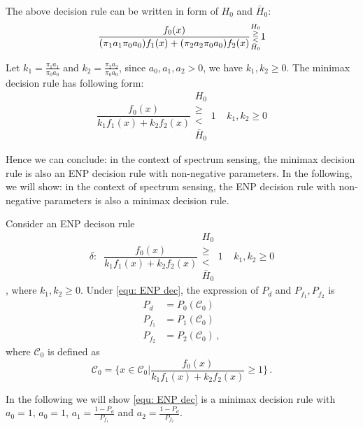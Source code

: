 \documentclass[12pt,journal,a4paper,twoside,onecolumn]{IEEEtran}
\begin{document}
\begin{spacing}{2.5}
The above decision rule can be written in form of $H_0$ and $\bar{H}_0$: 
\begin{equation}
\label{dec: delta}
\frac{f_0(x)}{(\pi_1a_1\/\pi_0a_0)f_1(x) + (\pi_2a_2\/\pi_0a_0)f_2(x)} \substack{H_0 \\ \geq \\ < \\ \bar{H}_0} 1
\end{equation}

Let $k_1 = \frac{\pi_1a_1}{\pi_0a_0}$ and $k_2 = \frac{\pi_2a_2}{\pi_0a_0}$, since $a_0, a_1, a_2 > 0$, we have $k_1, k_2 \geq 0$. The minimax decision rule has following form:
\begin{equation}
\label{equ: minimax form}
\frac{f_0(x)}{k_1f_1(x) + k_2f_2(x)} \substack{H_0 \\ \geq \\ < \\ \bar{H}_0} 1\;\;\;\;k_1, k_2 \geq 0
\end{equation}

Hence we can conclude: in the context of spectrum sensing, the minimax decision rule is also an ENP decision rule with non-negative parameters. In the following, we will show: in the context of spectrum sensing, the ENP decision rule with non-negative parameters is also a minimax decision rule.


Consider an ENP decison rule 
\begin{equation}
\label{equ: ENP dec}
\delta:\;\;\frac{f_0(x)}{k_1f_1(x) + k_2f_2(x)} \substack{H_0 \\ \geq \\ < \\ \bar{H}_0} 1\;\;\;\;k_1, k_2 \geq 0
\end{equation}
, where $k_1, k_2 \geq 0$.
Under \eqref{equ: ENP dec}, the expression of $P_d$ and $P_{f_1}, P_{f_2}$ is 
\begin{equation}
\begin{split}
\label{mini: condition}
P_d &= P_0(\mathcal{C}_0)\\
P_{f_1} &= P_1(\mathcal{C}_0)\\
P_{f_2} &= P_2(\mathcal{C}_0)\,,
\end{split}
\end{equation}
where $\mathcal{C}_0$ is defined as
\begin{equation}
\mathcal{C}_0 = \{ x \in \mathcal{C}_0 | \frac{f_0(x)}{k_1f_1(x) + k_2f_2(x)} \geq 1\}\,.
\end{equation}

In the following we will show \eqref{equ: ENP dec} is a minimax decision rule with $a_0 = 1$, $a_0 = 1$, $a_1 = \frac{1-P_d}{P_{f_1}}$ and $a_2 = \frac{1-P_d}{P_{f_2}}$. 


\end{spacing}
\end{document}
